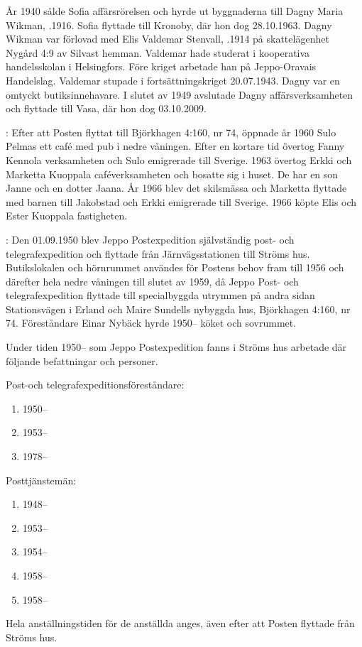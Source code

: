 	År 1940 sålde Sofia affärsrörelsen och hyrde ut byggnaderna till Dagny Maria Wikman, .1916. Sofia flyttade till Kronoby, där hon dog 28.10.1963. Dagny Wikman var förlovad med Elis Valdemar Stenvall, .1914 på skattelägenhet Nygård 4:9 av Silvast hemman. Valdemar hade studerat i kooperativa handelsskolan i	Helsingfors. Före kriget arbetade han på Jeppo-Oravais Handelslag. Valdemar stupade i fortsättningskriget 20.07.1943. Dagny var en	omtyckt butiksinnehavare. I slutet av 1949 avslutade Dagny affärsverksamheten och flyttade till Vasa, där hon dog 03.10.2009.



:  Efter att Posten flyttat till Björkhagen 4:160, nr 74, öppnade år 1960 Sulo Pelmas ett café med pub i nedre våningen. Efter	en kortare tid övertog Fanny Kennola verksamheten och Sulo emigrerade till Sverige. 1963 övertog Erkki och Marketta Kuoppala	caféverksamheten och bosatte sig i huset. De har en son Janne och en dotter Jaana. År 1966 blev det skilsmässa och Marketta flyttade med barnen till Jakobstad och Erkki emigrerade till Sverige. 1966 köpte Elis och Ester Kuoppala fastigheten.

:  Den 01.09.1950 blev Jeppo Postexpedition självständig post- och telegrafexpedition och flyttade från Järnvägsstationen till Ströms hus.	Butikslokalen och hörnrummet användes för Postens behov fram till	1956 och därefter hela nedre våningen till slutet av 1959, då Jeppo Post- och telegrafexpedition flyttade till specialbyggda utrymmen på	andra sidan Stationsvägen i Erland och Maire Sundells nybyggda hus,	Björkhagen 4:160, nr 74. Föreståndare Einar Nybäck hyrde 1950-- köket och sovrummet.

Under tiden 1950-- som Jeppo Postexpedition fanns i Ströms hus arbetade där följande befattningar och personer.

Post-och telegrafexpeditionsföreståndare:
\begin{enumerate}
  \item {}    1950--
  \item {}   1953--
  \item {}    1978--
\end{enumerate}

Posttjänstemän:
\begin{enumerate}
  \item {}  1948--
  \item {}	      1953--
  \item {}        1954--
  \item {}	    1958--
  \item {}        1958--
\end{enumerate}
Hela anställningstiden för de anställda anges, även efter att Posten flyttade från Ströms hus.

